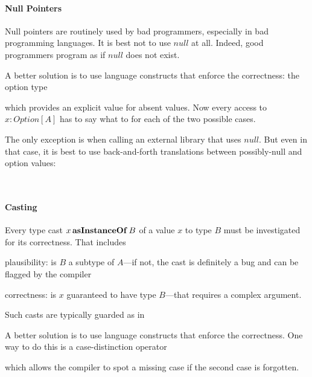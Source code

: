\paragraph{Null Pointers}
Null pointers are routinely used by bad programmers, especially in bad programming languages.
It is best not to use $null$ at all.
Indeed, good programmers program as if $null$ does not exist.

A better solution is to use language constructs that enforce the correctness: the option type
\begin{acode}
\end{acode}
which provides an explicit value for absent values.
Now every access to $x:Option[A]$ has to say what to for each of the two possible cases.

The only exception is when calling an external library that uses $null$.
But even in that case, it is best to use back-and-forth translations between possibly-null and option values:
\begin{acode}
\\
\end{acode}

\paragraph{Casting}
Every type cast $x \,\textbf{asInstanceOf}\; B$ of a value $x$ to type $B$ must be investigated for its correctness.
That includes 
\begin{compactitem}
 \item plausibility: is $B$ a subtype of $A$---if not, the cast is definitely a bug and can be flagged by the compiler
 \item correctness: is $x$ guaranteed to have type $B$---that requires a complex argument.
\end{compactitem}

Such casts are typically guarded as in
\begin{acode}
\end{acode}

A better solution is to use language constructs that enforce the correctness.
One way to do this is a case-distinction operator
\begin{acode}
\end{acode}
which allows the compiler to spot a missing case if the second case is forgotten.

